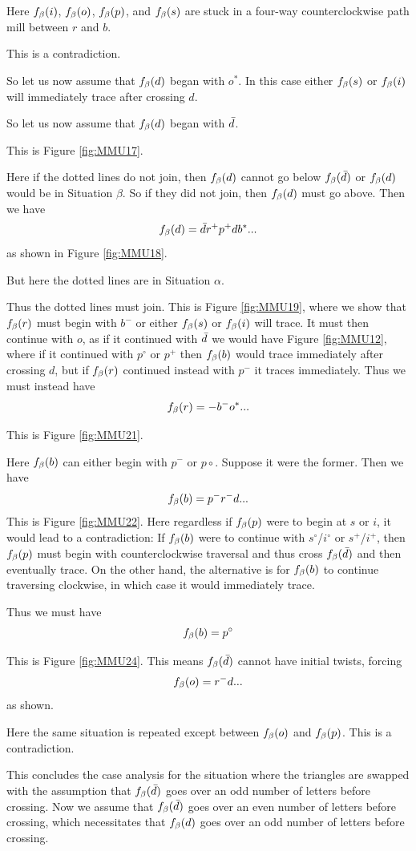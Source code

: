 Here $f_\beta(i)$, $f_\beta(o)$, $f_\beta(p)$, and $f_\beta(s)$ are stuck in a four-way counterclockwise path mill between $r$ and $b$. 

This is a contradiction.

So let us now assume that $f_\beta(d)$ began with $o^*$. In this case either $f_\beta(s)$ or $f_\beta(i)$ will immediately trace after crossing $d$.

So let us now assume that $f_\beta(d)$ began with $\bar{d}$.

This is Figure \ref{fig:MMU17}.

Here if the dotted lines do not join, then $f_\beta(d)$ cannot go below $f_\beta(\bar{d})$ or $f_\beta(d)$ would be in Situation $\beta$. So if they did not join, then $f_\beta(d)$ must go above. Then we have
\[
f_\beta(d) = \bar{d} r^+ p^+ d b^*...
\]
as shown in Figure \ref{fig:MMU18}.

But here the dotted lines are in Situation $\alpha$.

Thus the dotted lines must join. This is Figure \ref{fig:MMU19}, where we show that $f_\beta(r)$ must begin with $b^-$ or either $f_\beta(s)$ or $f_\beta(i)$ will trace. It must then continue with $o$, as if it continued with $\bar{d}$ we would have Figure \ref{fig:MMU12}, where if it continued with $p^\circ$ or $p^+$ then $f_\beta(b)$ would trace immediately after crossing $d$, but if $f_\beta(r)$ continued instead with $p^-$ it traces immediately. Thus we must instead have
\[
f_\beta(r) =- b^- o^*...
\]

This is Figure \ref{fig:MMU21}. 

Here $f_\beta(b)$ can either begin with $p^-$ or $p\circ$. Suppose it were the former. Then we have
\[
f_\beta(b) = p^- r^- d...
\]
This is Figure \ref{fig:MMU22}. Here regardless if $f_\beta(p)$ were to begin at $s$ or $i$, it would lead to a contradiction: If $f_\beta(b)$ were to continue with $s^\circ$/$i^\circ$ or $s^+$/$i^+$, then $f_\beta(p)$ must begin with counterclockwise traversal and thus cross $f_\beta(\bar{d})$ and then eventually trace. On the other hand, the alternative is for $f_\beta(b)$ to continue traversing clockwise, in which case it would immediately trace. 


Thus we must have
\[
f_\beta(b) = p^\circ
\]

This is Figure \ref{fig:MMU24}. This means $f_\beta(\bar{d})$ cannot have initial twists, forcing
\[
f_\beta(o) = r^- d...
\]
as shown.

Here the same situation is repeated except between $f_\beta(o)$ and $f_\beta(p)$. This is a contradiction.


This concludes the case analysis for the situation where the triangles are swapped with the assumption that $f_\beta(\bar{d})$ goes over an odd number of letters before crossing. Now we assume that $f_\beta(\bar{d})$ goes over an even number of letters before crossing, which necessitates that $f_\beta(d)$ goes over an odd number of letters before crossing.


